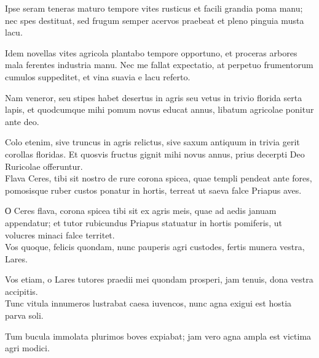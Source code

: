 {\large

\noindent Ipse seram teneras maturo tempore vites rusticus et facili grandia poma manu; nec spes destituat, sed frugum semper acervos praebeat et pleno pinguia musta lacu.\\

}

\noindent Idem novellas vites agricola plantabo tempore opportuno, et proceras arbores mala ferentes industria manu. Nec me fallat expectatio, at perpetuo frumentorum cumulos suppeditet, et vina suavia e lacu referto.\\

{\large

\noindent Nam veneror, seu stipes habet desertus in agris seu vetus in trivio florida serta lapis, et quodcumque mihi pomum novus educat annus, libatum agricolae ponitur ante deo.\\

}

\noindent Colo etenim, sive truncus in agris relictus, sive saxum antiquum in trivia gerit corollas floridas. Et quosvis fructus gignit mihi novus annus, prius decerpti Deo Ruricolae offeruntur. \\


{\large
\noindent Flava Ceres, tibi sit nostro de rure corona spicea, quae templi pendeat ante fores, pomosisque ruber custos ponatur in hortis, terreat ut saeva falce Priapus aves.\\

}


\noindent О Ceres flava, corona spicea tibi sit ex agris meis, quae ad aedis januam appendatur; et tutor rubicundus Priapus statuatur in hortis pomiferis, ut volucres minaci falce territet.\\ 

{\large
\noindent Vos quoque, felicis quondam, nunc pauperis agri custodes, fertis munera vestra, Lares.\\

}

\noindent Vos etiam, o Lares tutores praedii mei quondam prosperi, jam tenuis, dona vestra accipitis. \\

{\large
\noindent Tunc vitula innumeros lustrabat caesa iuvencos, nunc agna exigui est hostia parva soli.\\
}

\noindent Tum bucula immolata plurimos boves expiabat; jam vero agna ampla est victima agri modici.\\ 

